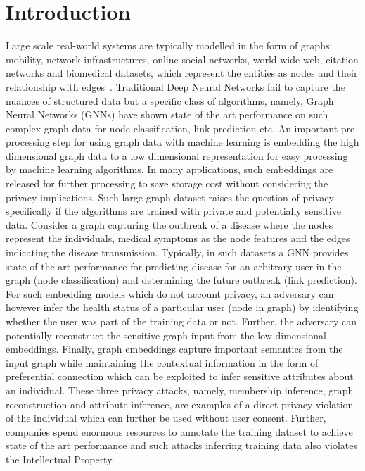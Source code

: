 \section{Introduction}\label{introduction}


Large scale real-world systems are typically modelled in the form of graphs: mobility, network infrastructures, online social networks, world wide web, citation networks and biomedical datasets, which represent the entities as nodes and their relationship with edges~\cite{zhou2018graph}.
Traditional Deep Neural Networks fail to capture the nuances of structured data but a specific class of algorithms, namely, Graph Neural Networks (GNNs) have shown state of the art performance on such complex graph data for node classification, link prediction etc.
An important pre-processing step for using graph data with machine learning is embedding the high dimensional graph data to a low dimensional representation for easy processing by machine learning algorithms.
In many applications, such embeddings are released for further processing to save storage cost without considering the privacy implications.
Such large graph dataset raises the question of privacy specifically if the algorithms are trained with private and potentially sensitive data.
Consider a graph capturing the outbreak of a disease where the nodes represent the individuals, medical symptoms as the node features and the edges indicating the disease transmission.
Typically, in such datasets a GNN provides state of the art performance for predicting disease for an arbitrary user in the graph (node classification) and determining the future outbreak (link prediction).
For such embedding models which do not account privacy, an adversary can however infer the health status of a particular user (node in graph) by identifying whether the user was part of the training data or not.
Further, the adversary can potentially reconstruct the sensitive graph input from the low dimensional embeddings. %
Finally, graph embeddings capture important semantics from the input graph while maintaining the contextual information in the form of preferential connection which can be exploited to infer sensitive attributes about an individual.
These three privacy attacks, namely, membership inference, graph reconstruction and attribute inference, are examples of a direct privacy violation of the individual which can further be used without user consent. %
Further, companies spend enormous resources to annotate the training dataset to achieve state of the art performance and such attacks inferring training data also violates the Intellectual Property.


